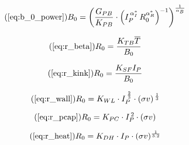 \begin{equation}
	\tag{\ref{eq:b_0_power}}
	B_0 = \left( \frac{ G_{PB} }{ K_{PB} } \cdot \left( I_P^{\,\alpha_I^*} \, R_0^{ \alpha_R^* } \right)^{-1} \right) ^ { \frac{1}{ \alpha_B } }
\end{equation}

\begin{equation}
  \tag{\ref{eq:r_beta}}
  R_0 = \frac{ K_{TB} \overline{T} }{ B_0 }
\end{equation}

\begin{equation}
	\tag{\ref{eq:r_kink}}
   R_0 = \frac{ K_{SF} I_P }{ B_0 }
\end{equation}

\begin{equation}
	\tag{\ref{eq:r_wall}}
	R_0 = K_{WL} \cdot I_P^{ \, \frac{2}{3} } \cdot (\sigma v) ^{ \, \frac{1}{3} }
\end{equation}

\begin{equation}
	\tag{\ref{eq:r_pcap}}
	R_0 = K_{PC} \cdot I_P^{\,2} \cdot (\sigma v)
\end{equation}

\begin{equation}
	\tag{\ref{eq:r_heat}}
	R_0 = K_{DH} \cdot I_P \cdot (\sigma v)^ {\frac{1}{3.2}} 
\end{equation}

%
